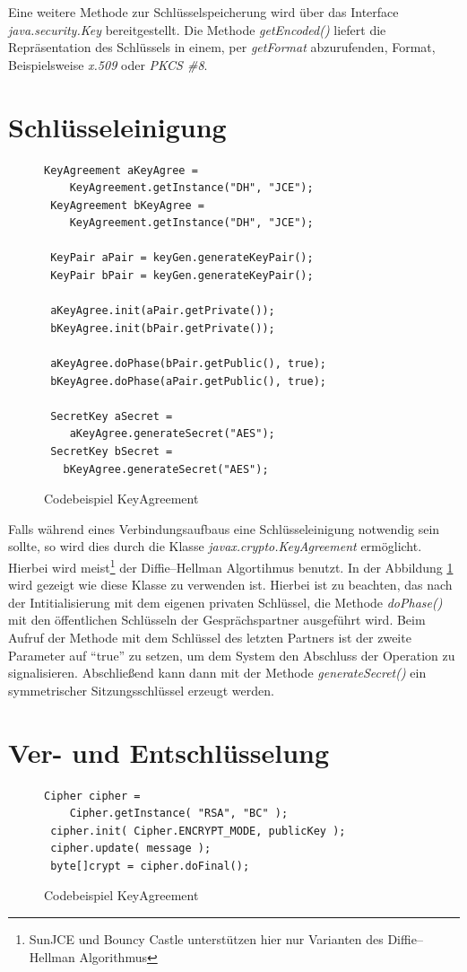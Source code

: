 \documentclass[11pt,a4paper]{scrreprt}
\begin{document}
Eine weitere Methode zur Schlüsselspeicherung wird über das Interface \textit{
java.security.Key} bereitgestellt. Die Methode \textit{getEncoded()} liefert die Repräsentation des Schlüssels in einem, per \textit{getFormat} abzurufenden, Format, Beispielsweise \textit{x.509} oder \textit{PKCS \#8}.

\section{Schlüsseleinigung}

\begin{figure}[hbtp]
\caption{Codebeispiel KeyAgreement}
\begin{lstlisting}[frame=shadowbox]
 KeyAgreement aKeyAgree =
  	KeyAgreement.getInstance("DH", "JCE");
 KeyAgreement bKeyAgree = 
  	KeyAgreement.getInstance("DH", "JCE");
   
 KeyPair aPair = keyGen.generateKeyPair();
 KeyPair bPair = keyGen.generateKeyPair();
 
 aKeyAgree.init(aPair.getPrivate());
 bKeyAgree.init(bPair.getPrivate());
 
 aKeyAgree.doPhase(bPair.getPublic(), true);
 bKeyAgree.doPhase(aPair.getPublic(), true);

 SecretKey aSecret =
   	aKeyAgree.generateSecret("AES");
 SecretKey bSecret =
   bKeyAgree.generateSecret("AES");
\end{lstlisting}
\label{KeyAgree}
\end{figure}

Falls während eines Verbindungsaufbaus eine Schlüsseleinigung notwendig sein sollte, so wird dies durch die Klasse \textit{javax.crypto.KeyAgreement} ermöglicht. Hierbei wird meist\footnote{SunJCE und Bouncy Castle unterstützen hier nur Varianten des Diffie–Hellman Algorithmus} der Diffie–Hellman Algortihmus benutzt. In der Abbildung \ref{KeyAgree} wird gezeigt wie diese Klasse zu verwenden ist. Hierbei ist zu beachten, das nach der Intitialisierung mit dem eigenen privaten Schlüssel, die Methode \textit{doPhase()} mit den öffentlichen Schlüsseln der Gesprächspartner ausgeführt wird. Beim Aufruf der Methode mit dem Schlüssel des letzten Partners ist der zweite Parameter auf "`true"' zu setzen, um dem System den Abschluss der Operation zu signalisieren. Abschließend kann dann mit der Methode \textit{generateSecret()} ein symmetrischer Sitzungsschlüssel erzeugt werden.

\section{Ver- und Entschlüsselung}


\begin{figure}[hbtp]
\caption{Codebeispiel KeyAgreement}
\begin{lstlisting}[frame=shadowbox]
 Cipher cipher = 
 	Cipher.getInstance( "RSA", "BC" );
 cipher.init( Cipher.ENCRYPT_MODE, publicKey );
 cipher.update( message );
 byte[]crypt = cipher.doFinal();
\end{lstlisting}
\label{encrypt}
\end{figure}


\nocite{Eckert13}
\nocite{Engelbrecht04}
{}

\end{document}
